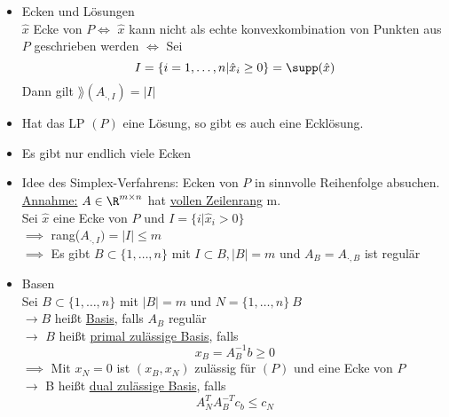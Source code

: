 \begin{itemize}
	\item Ecken und Lösungen\\
		$ \hat{x}$ Ecke von $P \iff$  $ \hat{x}$ kann nicht als echte konvexkombination von Punkten aus $P$ geschrieben werden
		$\iff$ Sei 
		\begin{equation*}
			I = \{i = 1 ,\dots, n | \hat{x}_{i} \geq 0 \} = \supp(\hat{x})
		\end{equation*} 
		Dann gilt $\rang(A_{\cdot,I})=|I|$
	\item Hat das LP $(P)$ eine Lösung, so gibt es auch eine Ecklösung.
	\item Es gibt nur endlich viele Ecken
	\item Idee des Simplex-Verfahrens: Ecken von $P$ in sinnvolle Reihenfolge absuchen.\\
		\underline{Annahme:} $A \in \R^{m \times n }$ hat \underline{vollen Zeilenrang} m. \\
		Sei $\hat{x}$ eine Ecke von $P$ und $I = \{i | \hat{x}_{i}>0\}$ \\
		$\implies$ rang($A_{\cdot,I}   )= |I| \leq m$ \\
		$\implies$ Es gibt $B \subset \{1,\dots,n\}$ mit $I \subset B, |B| = m $ und $A_{B}= A_{\cdot,B}$ ist regulär
	\item Basen\\
		Sei $B \subset \{1,\dots,n\}$ mit $|B|=m$ und $N = \{1,\dots,n\}\ B$\\
		$\to B$ heißt \underline{Basis}, falls $A_{B}$ regulär\\
		$\to$ $B$ heißt \underline{primal zulässige Basis}, falls
		\begin{equation*}
			x_{B}=A_{B}^{-1}b \geq 0 
		\end{equation*} $\implies$ Mit $x_{N} = 0$ ist $(x_{B},x_{N})$ zulässig für $(P)$ und eine Ecke von $P$ \\
		$\to$ B heißt \underline{dual zulässige Basis}, falls 
		\begin{equation*}
			A_{N}^TA_{B}^{-T}c_{b} \leq c_{N}
		\end{equation*} %
\end{itemize} 

